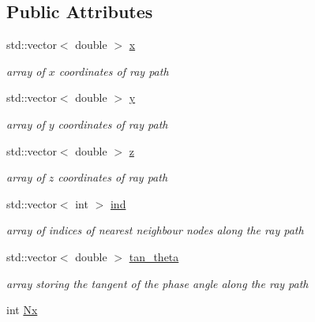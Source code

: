 \subsection*{Public Attributes}
\begin{DoxyCompactItemize}
\item 
\hypertarget{class_ray_ad160cb47acacdb05e920ce0d88135d2c}{}std\+::vector$<$ double $>$ \hyperlink{class_ray_ad160cb47acacdb05e920ce0d88135d2c}{x}\label{class_ray_ad160cb47acacdb05e920ce0d88135d2c}

\begin{DoxyCompactList}\small\item\em array of $x$ coordinates of ray path \end{DoxyCompactList}\item 
\hypertarget{class_ray_a045afd15989ea118e479c7c564783964}{}std\+::vector$<$ double $>$ \hyperlink{class_ray_a045afd15989ea118e479c7c564783964}{y}\label{class_ray_a045afd15989ea118e479c7c564783964}

\begin{DoxyCompactList}\small\item\em array of $y$ coordinates of ray path \end{DoxyCompactList}\item 
\hypertarget{class_ray_a14e702c94a758047b9092ab08eda855e}{}std\+::vector$<$ double $>$ \hyperlink{class_ray_a14e702c94a758047b9092ab08eda855e}{z}\label{class_ray_a14e702c94a758047b9092ab08eda855e}

\begin{DoxyCompactList}\small\item\em array of $z$ coordinates of ray path \end{DoxyCompactList}\item 
\hypertarget{class_ray_a839eb936105ab5d984bb91bdfb4245ff}{}std\+::vector$<$ int $>$ \hyperlink{class_ray_a839eb936105ab5d984bb91bdfb4245ff}{ind}\label{class_ray_a839eb936105ab5d984bb91bdfb4245ff}

\begin{DoxyCompactList}\small\item\em array of indices of nearest neighbour nodes along the ray path \end{DoxyCompactList}\item 
\hypertarget{class_ray_ab84f0d4f37969ac7333a9253b4c5fc1b}{}std\+::vector$<$ double $>$ \hyperlink{class_ray_ab84f0d4f37969ac7333a9253b4c5fc1b}{tan\+\_\+theta}\label{class_ray_ab84f0d4f37969ac7333a9253b4c5fc1b}

\begin{DoxyCompactList}\small\item\em array storing the tangent of the phase angle along the ray path \end{DoxyCompactList}\item 
\hypertarget{class_ray_af7d096e9699fb46b41452c5fc7b4c52c}{}int \hyperlink{class_ray_af7d096e9699fb46b41452c5fc7b4c52c}{Nx}\label{class_ray_af7d096e9699fb46b41452c5fc7b4c52c}


\end{DoxyCompactItemize}
